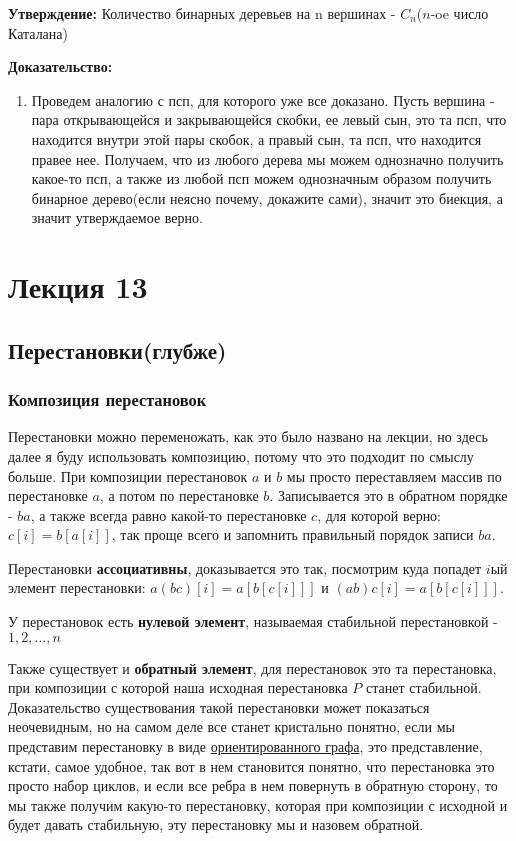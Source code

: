 \documentclass{article}
\begin{document}
\textbf{Утверждение:} Количество бинарных деревьев на n вершинах -  $C_n$($n$-oe число Каталана)

\textbf{Доказательство:}
\begin{enumerate}
    \item Проведем аналогию с псп, для которого уже все доказано. Пусть вершина - пара открывающейся и закрывающейся скобки, ее левый сын, это та псп, что находится внутри этой пары скобок, а правый сын, та псп, что находится правее нее. Получаем, что из любого дерева мы можем однозначно получить какое-то псп, а также из любой псп можем однозначным образом получить бинарное дерево(если неясно почему, докажите сами), значит это биекция, а значит утверждаемое верно. 
\end{enumerate}

\section{Лекция 13}
\subsection{Перестановки(глубже)}
\subsubsection{Композиция перестановок}
Перестановки можно переменожать, как это было названо на лекции, но здесь далее я буду использовать композицию, потому что это подходит по смыслу больше. При композиции перестановок $a$ и $b$ мы просто переставляем массив по перестановке $a$, а потом по перестановке $b$. Записывается это в обратном порядке - $ba$, а также всегда равно какой-то перестановке $c$, для которой верно: $c[i] = b[a[i]]$, так проще всего и запомнить правильный порядок записи $ba$.

Перестановки \textbf{ассоциативны}, доказывается это так, посмотрим куда попадет $i$ый элемент перестановки: $a(bc)[i]=a[b[c[i]]]$ и $(ab)c[i] = a[b[c[i]]]$.

У перестановок есть \textbf{нулевой элемент}, называемая стабильной перестановкой -  $1, 2, \dots, n$

Также существует и \textbf{обратный элемент}, для перестановок это та перестановка, при композиции с которой наша исходная перестановка $P$ станет стабильной. Доказательство существования такой перестановки может показаться неочевидным, но на самом деле все станет кристально понятно, если мы представим перестановку в виде \href{https://ru.wikipedia.org/wiki/%D0%9E%D1%80%D0%B8%D0%B5%D0%BD%D1%82%D0%B8%D1%80%D0%BE%D0%B2%D0%B0%D0%BD%D0%BD%D1%8B%D0%B9_%D0%B3%D1%80%D0%B0%D1%84}{ориентированного графа}, это представление, кстати, самое удобное, так вот в нем становится понятно, что перестановка это просто набор циклов, и если все ребра в нем повернуть в обратную сторону, то мы также получим какую-то перестановку, которая при композиции с исходной и будет давать стабильную, эту перестановку мы и назовем обратной.
\end{document}
